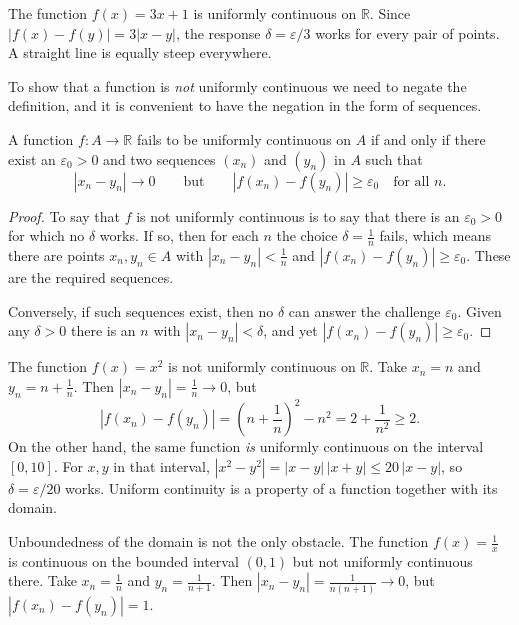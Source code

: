 \begin{example}
The function $f(x) = 3x + 1$ is uniformly continuous on $\mathbb{R}$.  Since $|f(x) - f(y)| = 3|x - y|$, the response $\delta = \varepsilon/3$ works for every pair of points.  A straight line is equally steep everywhere.
\end{example}

To show that a function is \emph{not} uniformly continuous we need to negate the definition, and it is convenient to have the negation in the form of sequences.

\begin{theorem}\label{thm:not-uniform}
A function $f : A \to \mathbb{R}$ fails to be uniformly continuous on $A$ if and only if there exist an $\varepsilon_0 > 0$ and two sequences $(x_n)$ and $(y_n)$ in $A$ such that
\[ |x_n - y_n| \to 0 \qquad \text{but} \qquad |f(x_n) - f(y_n)| \geq \varepsilon_0 \quad \text{for all } n. \]
\end{theorem}

\begin{proof}
To say that $f$ is not uniformly continuous is to say that there is an $\varepsilon_0 > 0$ for which no $\delta$ works.  If so, then for each $n$ the choice $\delta = \frac1n$ fails, which means there are points $x_n, y_n \in A$ with $|x_n - y_n| < \frac1n$ and $|f(x_n) - f(y_n)| \geq \varepsilon_0$.  These are the required sequences.

Conversely, if such sequences exist, then no $\delta$ can answer the challenge $\varepsilon_0$.  Given any $\delta > 0$ there is an $n$ with $|x_n - y_n| < \delta$, and yet $|f(x_n) - f(y_n)| \geq \varepsilon_0$.
\end{proof}

\begin{example}
The function $f(x) = x^2$ is not uniformly continuous on $\mathbb{R}$.  Take $x_n = n$ and $y_n = n + \frac1n$.  Then $|x_n - y_n| = \frac1n \to 0$, but
\[ |f(x_n) - f(y_n)| = \left(n + \frac1n\right)^2 - n^2 = 2 + \frac{1}{n^2} \geq 2. \]
On the other hand, the same function \emph{is} uniformly continuous on the interval $[0,10]$.  For $x, y$ in that interval, $|x^2 - y^2| = |x - y|\,|x + y| \leq 20\,|x - y|$, so $\delta = \varepsilon/20$ works.  Uniform continuity is a property of a function together with its domain.
\end{example}

\begin{example}
Unboundedness of the domain is not the only obstacle.  The function $f(x) = \frac1x$ is continuous on the bounded interval $(0,1)$ but not uniformly continuous there.  Take $x_n = \frac1n$ and $y_n = \frac{1}{n+1}$.  Then $|x_n - y_n| = \frac{1}{n(n+1)} \to 0$, but $|f(x_n) - f(y_n)| = 1$.
\end{example}

